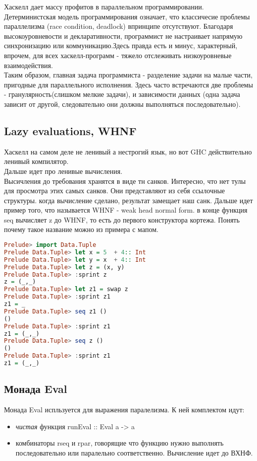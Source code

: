 \documentclass[12pt,a4paper]{article}
\begin{document}
Хаскелл дает массу профитов в параллельном программировании. Детерминистская модель программирования означает, что классичесие проблемы параллелизма (race condition, deadlock) впринципе отсутствуют. Благодаря высокоуровневости и декларативности, программист не настраивает напрямую синхронизацию или коммуникацию.Здесь правда есть и минус, характерный, впрочем, для всех хаскелл-программ - тяжело отслеживать низкоуровневые взаимодействия.\\
Таким образом, главная задача программиста - разделение задачи на малые части, пригодные для параллельного исполнения. Здесь часто встречаются две проблемы - гранулярность(слишком мелкие задачи), и зависимости данных (одна задача зависит от другой, следовательно они должны выполняться последовательно).\\
\subsection{Lazy evaluations, WHNF}
Хаскелл на самом деле не ленивый а нестрогий язык, но вот GHC действительно ленивый компилятор.\\
Дальше идет про ленивые вычисления.\\
Высичления до требования хранятся в виде тн санков. Интересно, что нет тулы для просмотра этих самых санков. Они представляют из себя ссылочные структуры. когда вычисление сделано, результат замещает наш санк. Дальше идет пример того, что называется WHNF - weak head normal form. в конце функция seq вычисляет z до WHNF, то есть до первого конструктора кортежа. Понять почему такое название можно из примера с мапом.  \\

\begin{lstlisting}[language=Haskell]
Prelude> import Data.Tuple
Prelude Data.Tuple> let x = 5  + 4:: Int
Prelude Data.Tuple> let y = x  + 4:: Int
Prelude Data.Tuple> let z = (x, y)
Prelude Data.Tuple> :sprint z
z = (_,_)
Prelude Data.Tuple> let z1 = swap z
Prelude Data.Tuple> :sprint z1
z1 = _
Prelude Data.Tuple> seq z1 ()
()
Prelude Data.Tuple> :sprint z1
z1 = (_,_)
Prelude Data.Tuple> seq z ()
()
Prelude Data.Tuple> :sprint z1
z1 = (_,_)
\end{lstlisting}

\subsection{Монада Eval}

Монада Eval испльзуется для выражения паралелизма. К ней комплектом идут:
\begin{itemize}
\item \textit{чистая} функция runEval :: Eval a -> a
\item комбинаторы rseq и rpar, говорящие что функцию нужно выполнять последовательно или паралельно соответственно. Вычисление идет до ВХНФ.
\end{itemize}
\end{document}
